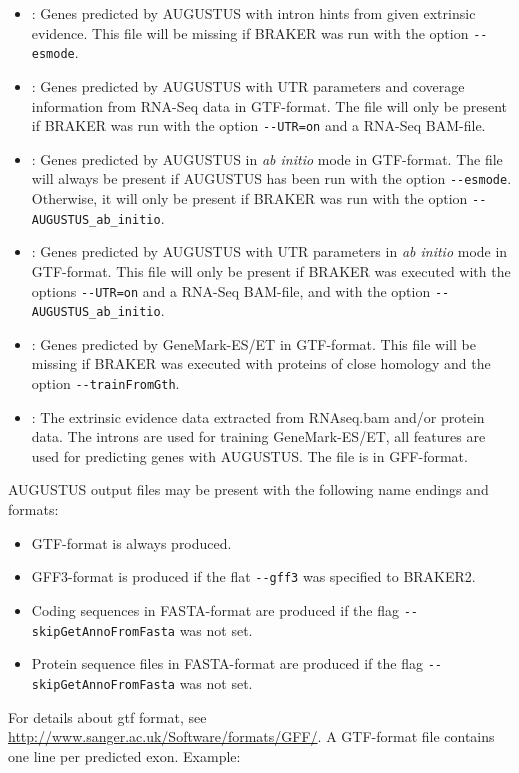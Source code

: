 \documentclass[]{article}
\begin{document}
\begin{itemize}
\item
  : Genes predicted by AUGUSTUS with intron hints from given extrinsic
  evidence. This file will be missing if BRAKER was run with the option
  \texttt{-\/-esmode}.
\item
  : Genes predicted by AUGUSTUS with UTR parameters and coverage
  information from RNA-Seq data in GTF-format. The file will only be
  present if BRAKER was run with the option \texttt{-\/-UTR=on} and a
  RNA-Seq BAM-file.
\item
  : Genes predicted by AUGUSTUS in \emph{ab initio} mode in GTF-format.
  The file will always be present if AUGUSTUS has been run with the
  option \texttt{-\/-esmode}. Otherwise, it will only be present if
  BRAKER was run with the option \texttt{-\/-AUGUSTUS\_ab\_initio}.
\item
  : Genes predicted by AUGUSTUS with UTR parameters in \emph{ab initio}
  mode in GTF-format. This file will only be present if BRAKER was
  executed with the options \texttt{-\/-UTR=on} and a RNA-Seq BAM-file,
  and with the option \texttt{-\/-AUGUSTUS\_ab\_initio}.
\item
  : Genes predicted by GeneMark-ES/ET in GTF-format. This file will be
  missing if BRAKER was executed with proteins of close homology and the
  option \texttt{-\/-trainFromGth}.
\item
  : The extrinsic evidence data extracted from RNAseq.bam and/or protein
  data. The introns are used for training GeneMark-ES/ET, all features
  are used for predicting genes with AUGUSTUS. The file is in
  GFF-format.
\end{itemize}

AUGUSTUS output files may be present with the following name endings and
formats:

\begin{itemize}
\item
  GTF-format is always produced.
\item
  GFF3-format is produced if the flat \texttt{-\/-gff3} was specified to
  BRAKER2.
\item
  Coding sequences in FASTA-format are produced if the flag
  \texttt{-\/-skipGetAnnoFromFasta} was not set.
\item
  Protein sequence files in FASTA-format are produced if the flag
  \texttt{-\/-skipGetAnnoFromFasta} was not set.
\end{itemize}

For details about gtf format, see
\url{http://www.sanger.ac.uk/Software/formats/GFF/}. A GTF-format file
contains one line per predicted exon. Example:
\end{document}
